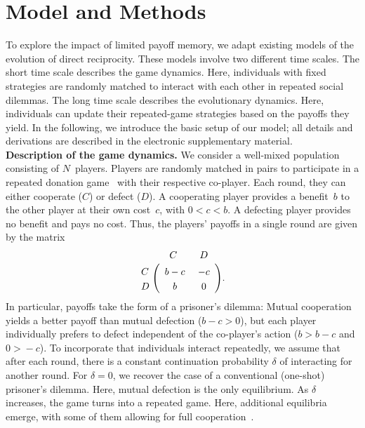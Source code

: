 \documentclass[11pt]{article}
\def\esm{electronic supplementary material}
\theoremstyle{plainCl1}
\theoremstyle{plainCl2}
\begin{document}


\section{Model and Methods}\label{section:model}


To explore the impact of limited payoff memory, we adapt existing models of the evolution of direct reciprocity.
These models involve two different time scales. 
The short time scale describes the game dynamics. 
Here, individuals with fixed strategies are randomly matched to interact with each other in repeated social dilemmas. 
The long time scale describes the evolutionary dynamics. 
Here, individuals can update their repeated-game strategies based on the payoffs they yield. 
In the following, we introduce the basic setup of our model; all details and derivations are described in the \esm.\\


\noindent
{\bf Description of the game dynamics.} We consider a well-mixed population consisting of $N$~players.
Players are randomly matched in pairs to participate in a repeated donation game~\citep{sigmund2010calculus} with their respective co-player.
Each round, they can either cooperate (\(C\)) or defect (\(D\)). 
A cooperating player provides a benefit~\(b\) to the other player at their own cost~\(c\), with \(0 \!<\! c \!<\! b\). 
A defecting player provides no benefit and pays no cost. 
Thus, the players' payoffs in a single round are given by the matrix
\begin{align}
\bordermatrix{%
	& C & D \cr
C &\ b-c &\ -c\  \cr
D &\ b &\ 0\ \cr
} .
\end{align}
In particular, payoffs take the form of a prisoner's dilemma:
Mutual cooperation yields a better payoff than mutual defection ($b\!-\!c\!>\!0$), but each player individually prefers to defect independent of the co-player's action ($b\!>\!b\!-\!c$ and $0\!>\!-c$). 
To incorporate that individuals interact repeatedly, we assume that after each round, there is a constant continuation probability $\delta$ of interacting for another round. 
For $\delta\!=\!0$, we recover the case of a conventional (one-shot) prisoner's dilemma. 
Here, mutual defection is the only equilibrium. 
As $\delta$ increases, the game turns into a repeated game. Here, additional equilibria emerge, with some of them allowing for full cooperation~\citep{friedman:RES:1971,Akin:chapter:2016,hilbe:GEB:2015,stewart:pnas:2014}. 
\end{document}
